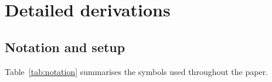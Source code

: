 \documentclass{manuscript}
\begin{document}
\section{Detailed derivations}\label{app:dr-derivation}

\setlength{\abovedisplayskip}{10pt plus 2pt minus 2pt}
\setlength{\belowdisplayskip}{10pt plus 2pt minus 2pt}
\setlength{\abovedisplayshortskip}{8pt plus 1pt minus 1pt}
\setlength{\belowdisplayshortskip}{8pt plus 1pt minus 1pt}

\subsection{Notation and setup}

Table~\ref{tab:notation} summarises the symbols used throughout the paper.
\end{document}
